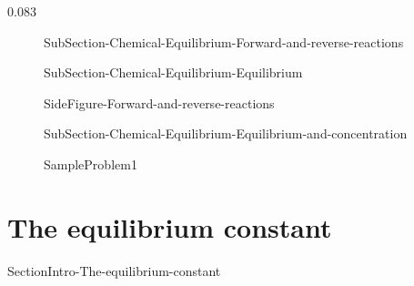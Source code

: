 0.083\documentclass[main.tex]{subfiles}
\begin{document}
\sloppy\begin{description}

\item[] {SubSection-Chemical-Equilibrium-Forward-and-reverse-reactions}




\item[] {SubSection-Chemical-Equilibrium-Equilibrium}




{SideFigure-Forward-and-reverse-reactions}




\item[] {SubSection-Chemical-Equilibrium-Equilibrium-and-concentration}



  {SampleProblem1}






\end{description}

 
\section{{The equilibrium constant}}   {SectionIntro-The-equilibrium-constant}
\end{document}
